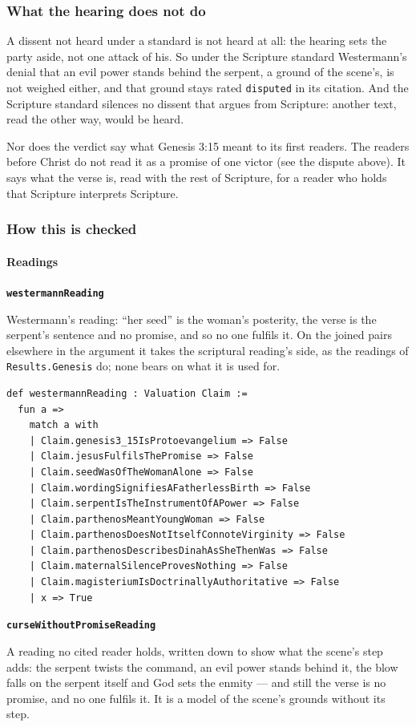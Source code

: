 \documentclass[11pt]{article}
\begin{document}
\subsubsection*{What the hearing does not do}
A dissent not heard under a standard is not heard at all: the hearing sets the party aside, not one attack of his. So under the Scripture standard Westermann’s denial that an evil power stands behind the serpent, a ground of the scene’s, is not weighed either, and that ground stays rated \texttt{disputed} in its citation. And the Scripture standard silences no dissent that argues from Scripture: another text, read the other way, would be heard.

Nor does the verdict say what Genesis 3:15 meant to its first readers. The readers before Christ do not read it as a promise of one victor (see the dispute above). It says what the verse is, read with the rest of Scripture, for a reader who holds that Scripture interprets Scripture.

\subsubsection*{How this is checked}
\paragraph*{Readings}
\leavevmode\par\nobreak
\par\medskip\noindent\textbf{\texttt{westermann\allowbreak{}Reading}}\par\nobreak\noindent
Westermann’s reading: “her seed” is the woman’s posterity, the verse is the serpent’s sentence and no promise, and so no one fulfils it. On the joined pairs elsewhere in the argument it takes the scriptural reading’s side, as the readings of \texttt{Results.Genesis} do; none bears on what it is used for.

{\small\begin{verbatim}
def westermannReading : Valuation Claim :=
  fun a =>
    match a with
    | Claim.genesis3_15IsProtoevangelium => False
    | Claim.jesusFulfilsThePromise => False
    | Claim.seedWasOfTheWomanAlone => False
    | Claim.wordingSignifiesAFatherlessBirth => False
    | Claim.serpentIsTheInstrumentOfAPower => False
    | Claim.parthenosMeantYoungWoman => False
    | Claim.parthenosDoesNotItselfConnoteVirginity => False
    | Claim.parthenosDescribesDinahAsSheThenWas => False
    | Claim.maternalSilenceProvesNothing => False
    | Claim.magisteriumIsDoctrinallyAuthoritative => False
    | x => True
\end{verbatim}}
\par\medskip\noindent\textbf{\texttt{curse\allowbreak{}Without\allowbreak{}Promise\allowbreak{}Reading}}\par\nobreak\noindent
A reading no cited reader holds, written down to show what the scene’s step adds: the serpent twists the command, an evil power stands behind it, the blow falls on the serpent itself and God sets the enmity — and still the verse is no promise, and no one fulfils it. It is a model of the scene’s grounds without its step.
\end{document}
